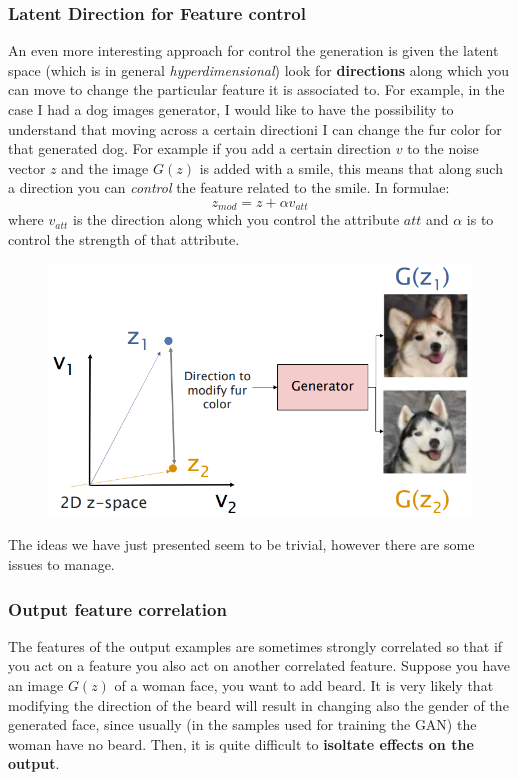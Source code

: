 \subsubsection{Latent Direction for Feature control}
An even more interesting approach for control the generation is given the latent space (which is in general \textit{hyperdimensional}) look for \textbf{directions} along which you can move to change the particular feature it is associated to. For example, in the case I had a dog images generator, I would like to have the possibility to understand that moving across a certain directioni I can change the fur color for that generated dog. For example if you add a certain direction $v$ to the noise vector $z$ and the image $G(z)$ is added with a smile, this means that along such a direction you can \textit{control} the feature related to the smile. In formulae:
\begin{equation*}
    z_{mod}=z+\alpha v_{att}
\end{equation*}
where $v_{att}$ is the direction along which you control the attribute $att$ and $\alpha$ is to control the strength of that attribute.

\begin{figure}[h]
    \centering
    \includegraphics[scale=0.6]{img/directCont.png}
\end{figure}

The ideas we have just presented seem to be trivial, however there are some issues to manage.

\subsubsection{Output feature correlation}
The features of the output examples are sometimes strongly correlated so that if you act on a feature you also act on another correlated feature. Suppose you have an image $G(z)$ of a woman face, you want to add beard. It is very likely that modifying the direction of the beard will result in changing also the gender of the generated face, since usually (in the samples used for training the GAN) the woman have no beard. Then, it is quite difficult to \textbf{isoltate effects on the output}.

